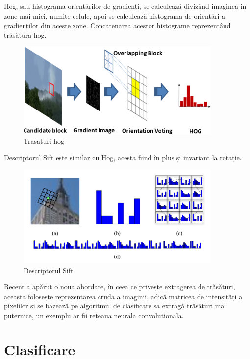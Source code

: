 Hog, sau histograma orientărilor de gradienți, se calculează divizând imaginea in zone mai mici, numite celule, apoi se calculează histograma de orientări a gradienților din aceste zone. 
Concatenarea acestor histograme reprezentând trăsătura hog.
\begin{figure}[H]
	\centering
		\includegraphics[width=0.90\textwidth]{imagini/OE_51_1_017208_f004.png}
	\caption{Trasaturi hog}
	\label{fig:OE_51_1_017208_f004}
\end{figure}

Descriptorul Sift este similar cu Hog, acesta fiind în plus și invariant la rotație.
\begin{figure}[H]
	\centering
		\includegraphics[width=0.90\textwidth]{imagini/sift.png}
	\caption{Descriptorul Sift}
	\label{fig:sift}
\end{figure}

Recent a apărut o noua abordare, în ceea ce privește extragerea de trăsături, aceasta folosește reprezentarea cruda a imaginii, adică matricea de intensități a pixelilor și se bazează pe algoritmul de clasificare sa extragă trăsături mai puternice, un exemplu ar fii rețeaua neurala convolutionala.\cite{lecun-98}

\pagebreak
\section{Clasificare}

